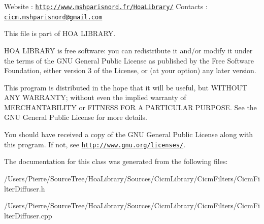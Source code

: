 Website \-: \href{http://www.mshparisnord.fr/HoaLibrary/}{\tt http\-://www.\-mshparisnord.\-fr/\-Hoa\-Library/} Contacts \-: \href{mailto:cicm.mshparisnord@gmail.com}{\tt cicm.\-mshparisnord@gmail.\-com}

This file is part of H\-O\-A L\-I\-B\-R\-A\-R\-Y.

H\-O\-A L\-I\-B\-R\-A\-R\-Y is free software\-: you can redistribute it and/or modify it under the terms of the G\-N\-U General Public License as published by the Free Software Foundation, either version 3 of the License, or (at your option) any later version.

This program is distributed in the hope that it will be useful, but W\-I\-T\-H\-O\-U\-T A\-N\-Y W\-A\-R\-R\-A\-N\-T\-Y; without even the implied warranty of M\-E\-R\-C\-H\-A\-N\-T\-A\-B\-I\-L\-I\-T\-Y or F\-I\-T\-N\-E\-S\-S F\-O\-R A P\-A\-R\-T\-I\-C\-U\-L\-A\-R P\-U\-R\-P\-O\-S\-E. See the G\-N\-U General Public License for more details.

You should have received a copy of the G\-N\-U General Public License along with this program. If not, see \href{http://www.gnu.org/licenses/}{\tt http\-://www.\-gnu.\-org/licenses/}. 

The documentation for this class was generated from the following files\-:\begin{DoxyCompactItemize}
\item 
/\-Users/\-Pierre/\-Source\-Tree/\-Hoa\-Library/\-Sources/\-Cicm\-Library/\-Cicm\-Filters/Cicm\-Filter\-Diffuser.\-h\item 
/\-Users/\-Pierre/\-Source\-Tree/\-Hoa\-Library/\-Sources/\-Cicm\-Library/\-Cicm\-Filters/Cicm\-Filter\-Diffuser.\-cpp\end{DoxyCompactItemize}
